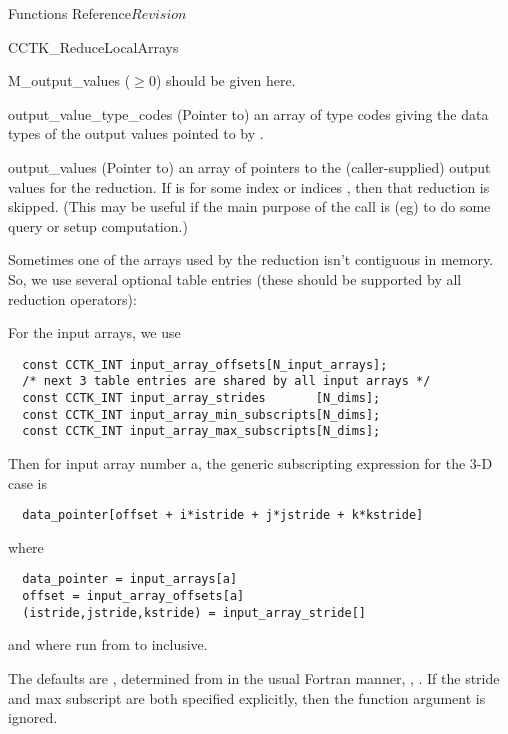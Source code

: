 \begin{cactuspart}{ Functions Reference}{}{$Revision$}
\begin{FunctionDescription}{CCTK\_ReduceLocalArrays}
\begin{ParameterSection}
\begin{Parameter}{M\_output\_values ($\ge 0$)}
should be given here.
\end{Parameter}
\begin{Parameter}{output\_value\_type\_codes}
(Pointer to) an array of     type
codes giving the data types of the output values pointed to by
.
\end{Parameter}
\begin{Parameter}{output\_values}
(Pointer to) an array of    pointers to the
(caller-supplied) output values for the reduction.
If   is  for some index or indices   ,
then that reduction is skipped.  (This may be useful if the main
purpose of the call is (eg) to do some query or setup computation.)
\end{Parameter}
\end{ParameterSection}

\begin{Discussion}
Sometimes one of the arrays used by the reduction isn't contiguous
in memory. So, we use several optional table entries
(these should be supported by all reduction operators):

For the input arrays, we use
\begin{verbatim}
  const CCTK_INT input_array_offsets[N_input_arrays];
  /* next 3 table entries are shared by all input arrays */
  const CCTK_INT input_array_strides       [N_dims];
  const CCTK_INT input_array_min_subscripts[N_dims];
  const CCTK_INT input_array_max_subscripts[N_dims];
\end{verbatim}

Then for input array number a, the generic subscripting expression for
the 3-D case is
\begin{verbatim}
  data_pointer[offset + i*istride + j*jstride + k*kstride]
\end{verbatim}
where
\begin{verbatim}
  data_pointer = input_arrays[a]
  offset = input_array_offsets[a]
  (istride,jstride,kstride) = input_array_stride[]
\end{verbatim}
and where  run from  to
 inclusive.

The defaults are , determined from
 in the usual Fortran manner,
,
.
 If the stride and max subscript are both specified explicitly, then the
 function argument is ignored.
\end{Discussion}


\end{FunctionDescription}
\end{cactuspart}
